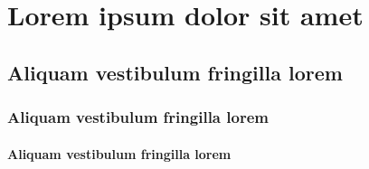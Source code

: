 \chapter{Lorem ipsum dolor sit amet}

\lipsum[1]

\section{Aliquam vestibulum fringilla lorem}

\subsection{Aliquam vestibulum fringilla lorem}
\subsubsection{Aliquam vestibulum fringilla lorem}


\lipsum[1]

\lipsum[2-3]